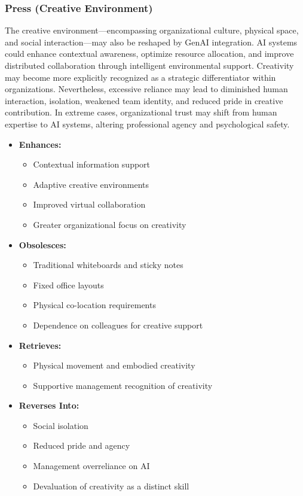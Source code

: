 \subsubsection{Press (Creative Environment)}
The creative environment—encompassing organizational culture, physical space, and social interaction—may also be reshaped by GenAI integration. AI systems could enhance contextual awareness, optimize resource allocation, and improve distributed collaboration through intelligent environmental support. Creativity may become more explicitly recognized as a strategic differentiator within organizations. Nevertheless, excessive reliance may lead to diminished human interaction, isolation, weakened team identity, and reduced pride in creative contribution. In extreme cases, organizational trust may shift from human expertise to AI systems, altering professional agency and psychological safety.

\begin{itemize}
    \item \textbf{Enhances:}
          \begin{itemize}
              \item Contextual information support
              \item Adaptive creative environments
              \item Improved virtual collaboration
              \item Greater organizational focus on creativity
          \end{itemize}

    \item \textbf{Obsolesces:}
          \begin{itemize}
              \item Traditional whiteboards and sticky notes
              \item Fixed office layouts
              \item Physical co-location requirements
              \item Dependence on colleagues for creative support
          \end{itemize}

    \item \textbf{Retrieves:}
          \begin{itemize}
              \item Physical movement and embodied creativity
              \item Supportive management recognition of creativity
          \end{itemize}

    \item \textbf{Reverses Into:}
          \begin{itemize}
              \item Social isolation
              \item Reduced pride and agency
              \item Management overreliance on AI
              \item Devaluation of creativity as a distinct skill
          \end{itemize}
\end{itemize}

